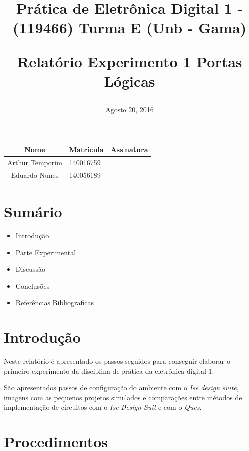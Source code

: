 \documentclass[12pts]{article}
\title{
	Prática de Eletrônica Digital 1 - (119466)
	\singlespacing
		Turma E (Unb - Gama)
	\singlespacing
	\begin{midpage}
	\begin {large}
		Relatório Experimento 1
		\singlespace
		Portas Lógicas
	\end {large}
	\end{midpage}
}
\date{Agosto 20, 2016}
\begin{document}
\maketitle	
\begin{center}

\begin{tabular}{|c|l|r|}
\hline
Nome & Matrícula & Assinatura\\
\hline
Arthur Temporim & 140016759 & \\
\hline	
Eduardo Nunes & 140056189 & \\
\hline	
\end{tabular}

\end{center}


\newpage

\section{Sumário}

\begin{itemize}
	\item Introdução
	\singlespacing
	\item Parte Experimental
	\singlespacing
	\item Discussão
	\singlespacing
	\item Conclusões 
	\singlespacing
	\item Referências Bibliograficas
	\singlespacing
\end{itemize}

\newpage


\section{Introdução}

	Neste relatório é apresentado os passos seguidos para conseguir elaborar o primeiro experimento da disciplina de prática da eletrônica digital 1.

	São apresentados passos de configuração do ambiente com o \textit{Ise design suite}, imagens com as pequenos projetos simulados e comparações entre métodos de implementação de circuitos com o \textit{Ise Design Suit} e com o \textit{Qucs}.

\section{Procedimentos}

\end{document}
